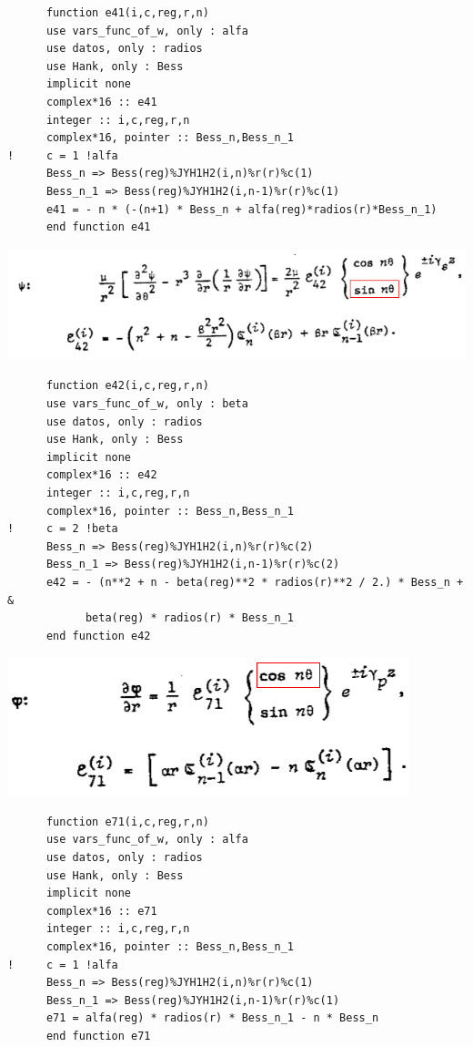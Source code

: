 \documentclass [11pt,spanish]{article}
\begin{document}
\begingroup
\fontsize{10pt}{12pt}
\selectfont
{}
\begin{shaded}
\begin{verbatim}
      function e41(i,c,reg,r,n)
      use vars_func_of_w, only : alfa
      use datos, only : radios
      use Hank, only : Bess
      implicit none
      complex*16 :: e41
      integer :: i,c,reg,r,n
      complex*16, pointer :: Bess_n,Bess_n_1
!     c = 1 !alfa
      Bess_n => Bess(reg)%JYH1H2(i,n)%r(r)%c(1)
      Bess_n_1 => Bess(reg)%JYH1H2(i,n-1)%r(r)%c(1)
      e41 = - n * (-(n+1) * Bess_n + alfa(reg)*radios(r)*Bess_n_1)
      end function e41
\end{verbatim}
\end{shaded}
\endgroup
\includegraphics[scale=0.5]{e42}
\begingroup
\fontsize{10pt}{12pt}
\selectfont
{}
\begin{shaded}
\begin{verbatim}
      function e42(i,c,reg,r,n)
      use vars_func_of_w, only : beta
      use datos, only : radios
      use Hank, only : Bess
      implicit none
      complex*16 :: e42
      integer :: i,c,reg,r,n
      complex*16, pointer :: Bess_n,Bess_n_1
!     c = 2 !beta
      Bess_n => Bess(reg)%JYH1H2(i,n)%r(r)%c(2)
      Bess_n_1 => Bess(reg)%JYH1H2(i,n-1)%r(r)%c(2)
      e42 = - (n**2 + n - beta(reg)**2 * radios(r)**2 / 2.) * Bess_n + &
            beta(reg) * radios(r) * Bess_n_1
      end function e42
\end{verbatim}
\end{shaded}
\endgroup
\includegraphics[scale=0.5]{e71}
\begingroup
\fontsize{10pt}{12pt}
\selectfont
{}
\begin{shaded}
\begin{verbatim}
      function e71(i,c,reg,r,n)
      use vars_func_of_w, only : alfa
      use datos, only : radios
      use Hank, only : Bess
      implicit none
      complex*16 :: e71
      integer :: i,c,reg,r,n
      complex*16, pointer :: Bess_n,Bess_n_1
!     c = 1 !alfa
      Bess_n => Bess(reg)%JYH1H2(i,n)%r(r)%c(1)
      Bess_n_1 => Bess(reg)%JYH1H2(i,n-1)%r(r)%c(1)
      e71 = alfa(reg) * radios(r) * Bess_n_1 - n * Bess_n
      end function e71
\end{verbatim}
\end{shaded}
\end{document}
